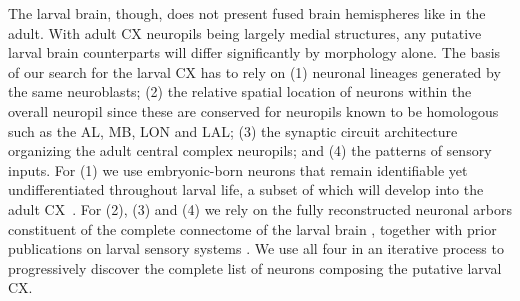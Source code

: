     The larval brain, though, does not present fused brain hemispheres like in the adult.
    With adult CX neuropils being largely medial structures, any putative larval brain counterparts will differ significantly by morphology alone.
    The basis of our search for the larval CX has to rely on (1) neuronal lineages generated by the same neuroblasts; (2) the relative spatial location of neurons within the overall neuropil since these are conserved for neuropils known to be homologous such as the AL, MB, LON and LAL; (3) the synaptic circuit architecture organizing the adult central complex neuropils; and (4) the patterns of sensory inputs.
    For (1) we use embryonic-born neurons that remain identifiable yet undifferentiated throughout larval life, a subset of which will develop into the adult CX~\citep{andrade2019developmentally}.
    For (2), (3) and (4) we rely on the fully reconstructed neuronal arbors constituent of the complete connectome of the larval brain \citep{winding2023connectome}, together with prior publications on larval sensory systems \citep{mast2014pheromones, ohyama2015multilevel, berck2016wiring, schlegel2016synaptic, larderet2017opticlobe, miroschnikow2018convergence, huckesfeld2021unveiling, hernandez2021thermo}.
    We use all four in an iterative process to progressively discover the complete list of neurons composing the putative larval CX.



